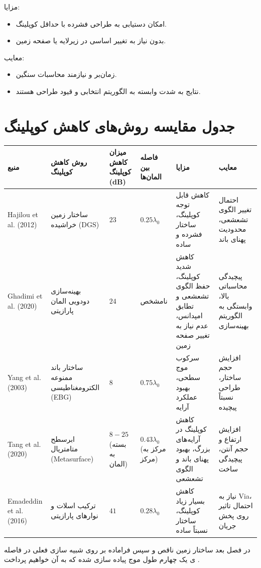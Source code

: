 مزایا:
\begin{itemize}
	\item {
		امکان دستیابی به طراحی فشرده با حداقل کوپلینگ.
	}
	\item {
	بدون نیاز به تغییر اساسی در زیرلایه یا صفحه زمین.
	}
\end{itemize}
معایب:
\begin{itemize}
	\item {
	زمان‌بر و نیازمند محاسبات سنگین.
	}
	\item{
	نتایج به شدت وابسته به الگوریتم انتخابی و قیود طراحی هستند.
	}
\end{itemize}


\section*{\textsf{جدول مقایسه روش‌های کاهش کوپلینگ}}
\begin{center}
\begin{tabular}{|>{\centering}m{2.5cm}|m{3cm}|>{\centering}m{2.5cm}|>{\centering}m{2.5cm}|m{4cm}|m{4cm}|}
\hline
\textbf{منبع} & \textbf{روش کاهش کوپلینگ} & \textbf{میزان کاهش کوپلینگ (dB)} & \textbf{فاصله بین المان‌ها} & \textbf{مزایا} & \textbf{معایب} \\
\hline
Hajilou et al. (2012) & ساختار زمین خراشیده (DGS) & $23$ & $0.25\lambda_0$ & کاهش قابل توجه کوپلینگ، ساختار فشرده و ساده & احتمال تغییر الگوی تشعشعی، محدودیت پهنای باند \\
\hline
Ghadimi et al. (2020) & بهینه‌سازی دودویی المان پارازیتی & $24$ & نامشخص & کاهش شدید کوپلینگ، حفظ الگوی تشعشعی و تطابق امپدانس، عدم نیاز به تغییر صفحه زمین & پیچیدگی محاسباتی بالا، وابستگی به الگوریتم بهینه‌سازی \\
\hline
Yang et al. (2003) & ساختار باند ممنوعه الکترومغناطیسی (EBG) & $8$ & $0.75\lambda_0$ & سرکوب موج سطحی، بهبود عملکرد آرایه & افزایش حجم ساختار، طراحی نسبتاً پیچیده \\
\hline
Tang et al. (2020) & ابرسطح متامتریال (Metasurface) & $8-25$ (بسته به المان) & $0.43\lambda_0$ (مرکز به مرکز) & کاهش کوپلینگ در آرایه‌های بزرگ، بهبود پهنای باند و الگوی تشعشعی & افزایش ارتفاع و حجم آنتن، پیچیدگی ساخت \\
\hline
Emadeddin et al. (2016) & ترکیب اسلات و نوارهای پارازیتی & $41$ & $0.28\lambda_0$ & کاهش بسیار زیاد کوپلینگ، ساختار نسبتاً ساده & نیاز به Via، احتمال تاثیر روی پخش جریان \\
\hline
\end{tabular}
\end{center}


در فصل بعد ساختار زمین ناقص
 و سپس فراماده
  بر روی شبیه سازی فعلی در فاصله ی یک چهارم طول موج پیاده سازی شده که به آن خواهیم پرداخت
\cite{ghadimi2020systematic}.













